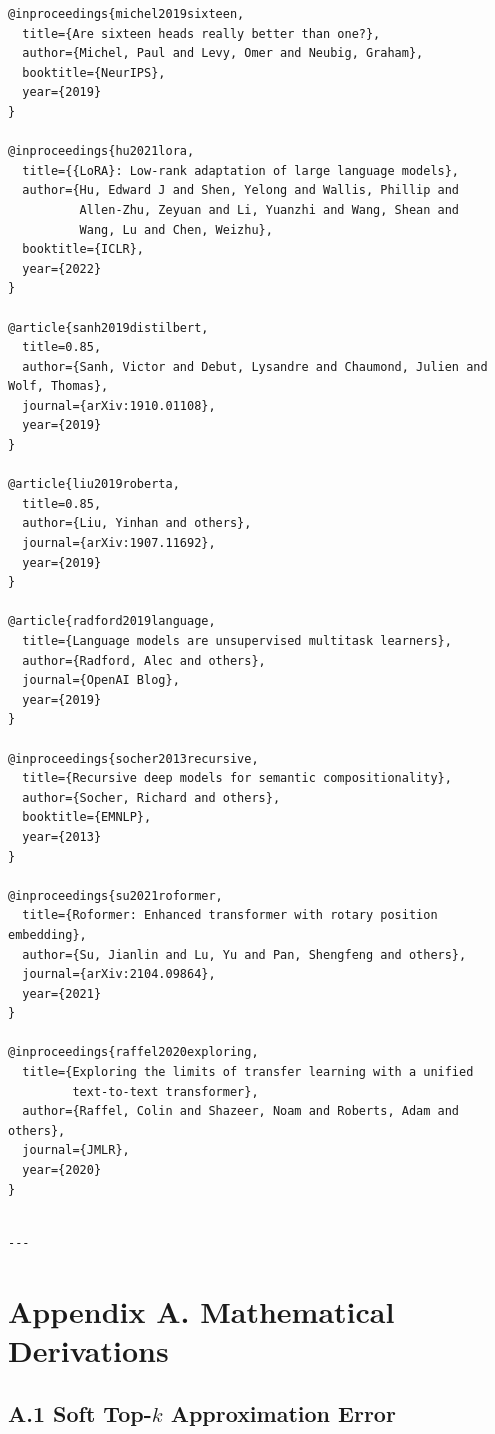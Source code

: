 \begin{lstlisting}
@inproceedings{michel2019sixteen,
  title={Are sixteen heads really better than one?},
  author={Michel, Paul and Levy, Omer and Neubig, Graham},
  booktitle={NeurIPS},
  year={2019}
}

@inproceedings{hu2021lora,
  title={{LoRA}: Low-rank adaptation of large language models},
  author={Hu, Edward J and Shen, Yelong and Wallis, Phillip and 
          Allen-Zhu, Zeyuan and Li, Yuanzhi and Wang, Shean and 
          Wang, Lu and Chen, Weizhu},
  booktitle={ICLR},
  year={2022}
}

@article{sanh2019distilbert,
  title=0.85,
  author={Sanh, Victor and Debut, Lysandre and Chaumond, Julien and Wolf, Thomas},
  journal={arXiv:1910.01108},
  year={2019}
}

@article{liu2019roberta,
  title=0.85,
  author={Liu, Yinhan and others},
  journal={arXiv:1907.11692},
  year={2019}
}

@article{radford2019language,
  title={Language models are unsupervised multitask learners},
  author={Radford, Alec and others},
  journal={OpenAI Blog},
  year={2019}
}

@inproceedings{socher2013recursive,
  title={Recursive deep models for semantic compositionality},
  author={Socher, Richard and others},
  booktitle={EMNLP},
  year={2013}
}

@inproceedings{su2021roformer,
  title={Roformer: Enhanced transformer with rotary position embedding},
  author={Su, Jianlin and Lu, Yu and Pan, Shengfeng and others},
  journal={arXiv:2104.09864},
  year={2021}
}

@inproceedings{raffel2020exploring,
  title={Exploring the limits of transfer learning with a unified 
         text-to-text transformer},
  author={Raffel, Colin and Shazeer, Noam and Roberts, Adam and others},
  journal={JMLR},
  year={2020}
}
\end{lstlisting}
\begin{lstlisting}

---
\end{lstlisting}


\section{Appendix A. Mathematical Derivations}

\subsection{A.1 Soft Top-$k$ Approximation Error}

